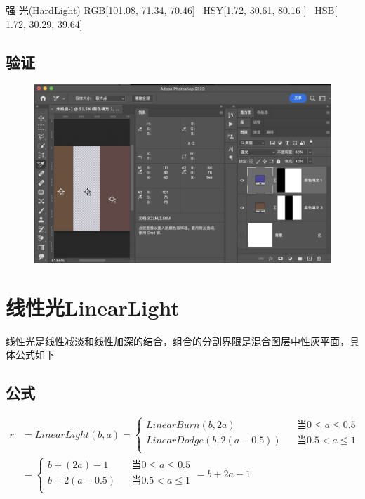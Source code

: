 \begin{result}
\item 强    光(HardLight)     RGB[101.08,  71.34,  70.46]~ HSY[1.72,  30.61,  80.16  ]~ HSB[  1.72,  30.29,  39.64]
\end{result}
\subsection{ 验证}
\begin{figure}[h!]
	\centering
	\includegraphics[width=\linewidth]{figure/hardlight}
	\caption{}
	\label{fig:hardlight}
\end{figure}


%
\newpage
\section{ 线性光LinearLight}

线性光是线性减淡和线性加深的结合，组合的分割界限是混合图层中性灰平面，具体公式如下

\subsection{ 公式}

\begin{equation}
	\begin{aligned}r&= LinearLight(b,a)=\left\{\begin{aligned}LinearBurn(b,2a)&&当 0\leq a \leq 0.5\\LinearDodge(b,2(a-0.5))&&当 0.5< a \leq 1\\\end{aligned}\right.\\&=\left\{\begin{aligned}b+(2a)-1&&当 0\leq a \leq 0.5\\b+2(a-0.5)&&当 0.5< a \leq 1\\\end{aligned}\right.=b+2a-1\end{aligned}
	\end{equation}

